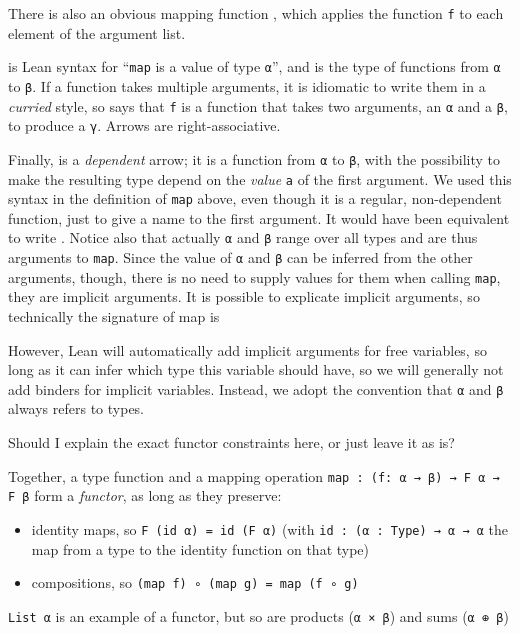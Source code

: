 \documentclass[titlepage]{report}
\newenvironment{remark}{%
\begin{framed}
\begin{trivlist}
    \item[\hskip \labelsep {\bfseries Remark:}]}%
{%
\end{trivlist}%
\end{framed}
}
\newenvironment{todo}{\begin{shaded}\begin{trivlist}                         
    \item[\hskip \labelsep {\bfseries Todo:}]}{\end{trivlist}\end{shaded}}
\begin{document}
There is also an obvious mapping function , 
which applies the function \texttt{f} to each element of the argument list.

\begin{remark}
     is Lean syntax for ``\texttt{map} is a value of type \texttt{α}'', and  is the type of functions from \texttt{α} to \texttt{β}. 
    If a function takes multiple arguments, it is idiomatic to write them in a \emph{curried} style,
    so  says that \texttt{f} is a function that takes two arguments, an \texttt{α} and a \texttt{β}, to produce a \texttt{γ}. Arrows are right-associative.

    Finally,  is a \emph{dependent} arrow; it is a function from \texttt{α} to \texttt{β}, with the possibility to make the resulting type depend on the \emph{value} \texttt{a} of the first argument. 
    We used this syntax in the definition of \texttt{map} above, even though it is a regular, non-dependent function, just to give a name to the first argument. 
    It would have been equivalent to write .
    Notice also that actually \texttt{α} and \texttt{β} range over all types and are thus arguments to \texttt{map}. Since the value of \texttt{α} and \texttt{β} can be inferred from the other arguments, though, there is no need to supply values for them when calling \texttt{map}, they are implicit arguments. It is possible to explicate implicit arguments, so technically the signature of map is 
    \begin{center}
    \end{center}
    However, Lean will automatically add implicit arguments for free variables, so long as it can infer which type this variable should have, so we will generally not add binders for implicit variables. Instead, we adopt the convention that \texttt{α} and \texttt{β} always refers to types. 
\end{remark}

\begin{todo}
    Should I explain the exact functor constraints here, or just leave it as is?
\end{todo}

Together, a type function  and a mapping operation \texttt{map : (f: α → β) → F α → F β} form a \emph{functor}, as long as they preserve: 
\begin{itemize}
    \item identity maps, so \texttt{F (id α) = id (F α)} (with \texttt{id : (α : Type) → α → α} the map from a type to the identity function on that type)
    \item compositions, so \texttt{(map f) ∘ (map g) = map (f ∘ g)}
\end{itemize}
\texttt{List α} is an example of a functor, but so are products (\texttt{α × β}) and sums 
(\texttt{α ⊕ β})
\end{document}
